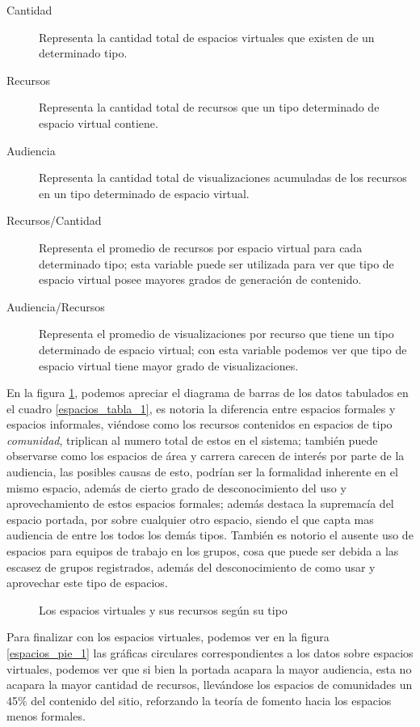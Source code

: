 \begin{description}
\item [Cantidad] Representa la cantidad total de espacios virtuales que existen
de un determinado tipo.
\item [Recursos] Representa la cantidad total de recursos que un tipo
determinado de espacio virtual contiene.
\item [Audiencia] Representa la cantidad total de visualizaciones acumuladas de
los recursos en un tipo determinado de espacio virtual.
\item [Recursos/Cantidad] Representa el promedio de recursos por espacio virtual
para cada determinado tipo; esta variable puede ser utilizada para ver que tipo
de espacio virtual posee mayores grados de generación de contenido.
\item [Audiencia/Recursos] Representa el promedio de visualizaciones por recurso
que tiene un tipo determinado de espacio virtual; con esta variable podemos ver
que tipo de espacio virtual tiene mayor grado de visualizaciones.
\end{description}

En la figura \ref{espacios_bars_1}, podemos apreciar el diagrama de barras de
los datos tabulados en el cuadro \ref{espacios_tabla_1}, es notoria la
diferencia entre espacios formales y espacios informales, viéndose como los
recursos contenidos en espacios de tipo \emph{comunidad}, triplican al numero
total de estos en el sistema; también puede observarse como los espacios de área
y carrera carecen de interés por parte de la audiencia, las posibles causas de
esto, podrían ser la formalidad inherente en el mismo espacio, además de cierto
grado de desconocimiento del uso y aprovechamiento de estos espacios formales;
además destaca la supremacía del espacio portada, por sobre cualquier otro
espacio, siendo el que capta mas audiencia de entre los todos los demás tipos.
También es notorio el ausente uso de espacios para equipos de trabajo en los
grupos, cosa que puede ser debida a las escasez de grupos registrados, además
del desconocimiento de como usar y aprovechar este tipo de espacios.

\begin{figure}
\centering

\caption{Los espacios virtuales y sus recursos según su tipo}
\label{espacios_bars_1}
\end{figure}

Para finalizar con los espacios virtuales, podemos ver en la figura
\ref{espacios_pie_1} las gráficas circulares correspondientes a los datos sobre
espacios virtuales, podemos ver que si bien la portada acapara la mayor
audiencia, esta no acapara la mayor cantidad de recursos, llevándose los
espacios de comunidades un 45\% del contenido del sitio, reforzando la teoría de
fomento hacia los espacios menos formales.

